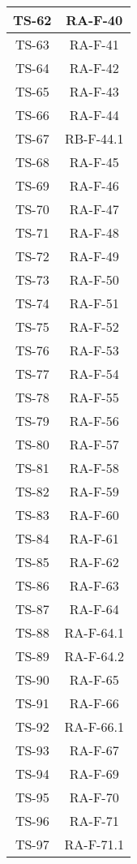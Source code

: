 \begin{center}
\begin{longtable}{|c|c|}
			\hline
			TS-62 & RA-F-40 \\
			\hline
			TS-63 & RA-F-41 \\
			\hline
			TS-64 & RA-F-42 \\
			\hline
			TS-65 & RA-F-43 \\
			\hline
			TS-66 & RA-F-44 \\
			\hline
			TS-67 & RB-F-44.1 \\
			\hline
			TS-68 & RA-F-45 \\
			\hline
			TS-69 & RA-F-46 \\
			\hline
			TS-70 & RA-F-47 \\
			\hline
			TS-71 & RA-F-48 \\
			\hline
			TS-72 & RA-F-49 \\
			\hline
			TS-73 & RA-F-50 \\
			\hline
			TS-74 & RA-F-51 \\
			\hline
			TS-75 & RA-F-52 \\
			\hline
			TS-76 & RA-F-53 \\
			\hline
			TS-77 & RA-F-54 \\
			\hline
			TS-78 & RA-F-55 \\
			\hline
			TS-79 & RA-F-56 \\
			\hline
			TS-80 & RA-F-57 \\
			\hline
			TS-81 & RA-F-58 \\
			\hline
			TS-82 & RA-F-59 \\
			\hline
			TS-83 & RA-F-60 \\
			\hline
			TS-84 & RA-F-61 \\
			\hline
			TS-85 & RA-F-62 \\
			\hline
			TS-86 & RA-F-63 \\
			\hline
			TS-87 & RA-F-64 \\
			\hline
			TS-88 & RA-F-64.1 \\
			\hline
			TS-89 & RA-F-64.2 \\
			\hline
			TS-90 & RA-F-65 \\
			\hline
			TS-91 & RA-F-66 \\
			\hline
			TS-92 & RA-F-66.1 \\
			\hline
			TS-93 & RA-F-67 \\
			\hline
			TS-94 & RA-F-69 \\
			\hline
			TS-95 & RA-F-70 \\
			\hline
			TS-96 & RA-F-71 \\
			\hline
			TS-97 & RA-F-71.1 \\

\end{longtable}
\end{center}
